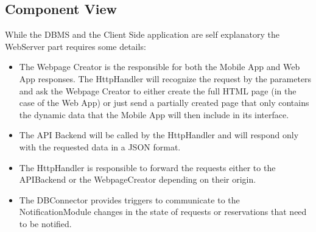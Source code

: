 \documentclass{article}
\begin{document}
	\subsection{Component View}
	\begin{figure}[H]
	\end{figure}
	While the DBMS and the Client Side application are self explanatory the WebServer part requires some details:
	\begin{itemize}
		\item The Webpage Creator is the responsible for both the Mobile App and Web App responses. The HttpHandler will recognize the request by the parameters and ask the Webpage Creator to either create the full HTML page (in the case of the Web App) or just send a partially created page that only contains the dynamic data that the Mobile App will then include in its interface.
		\item The API Backend will be called by the HttpHandler and will respond only with the requested data in a JSON format.
		\item The HttpHandler is responsible to forward the requests either to the APIBackend or the WebpageCreator depending on their origin.
		\item The DBConnector provides triggers to communicate to the NotificationModule changes in the state of requests or reservations that need to be notified.
	\end{itemize}
\end{document}
